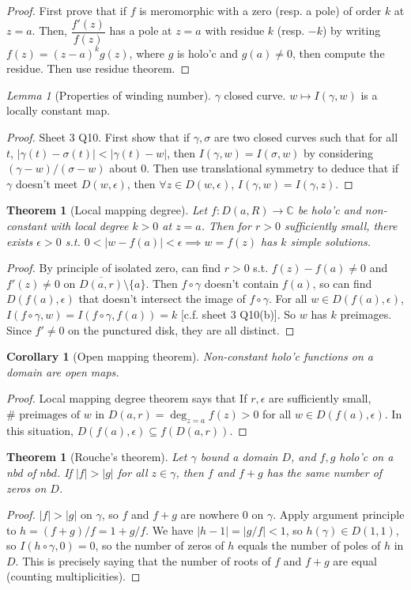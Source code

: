 \documentclass{article}
\theoremstyle{definition}
\theoremstyle{remark}
\newtheorem{lem}[defn]{Lemma}
\theoremstyle{plain}
\newtheorem{thm}[defn]{Theorem}
\newtheorem{crly}[defn]{Corollary}
\newcommand{\CC}{\mathbb{C}}
\begin{document}
\begin{proof}
    First prove that if $f$ is meromorphic with a zero (resp. a pole) of order $k$ at $z=a$. Then, $\dfrac{f'(z)}{f(z)}$ has a pole at $z=a$ with residue $k$ (resp. $-k$) by writing $f(z)=(z-a)^kg(z)$, where $g$ is holo'c and $g(a)\neq 0$, then compute the residue. Then use residue theorem.
\end{proof}
\begin{lem}[Properties of winding number]
    $\gamma$ closed curve. $w\mapsto I(\gamma,w)$ is a locally constant map.
\end{lem}
\begin{proof}
    Sheet 3 Q10. First show that if $\gamma,\sigma$ are two closed curves such that for all $t$, $|\gamma(t)-\sigma(t)|<|\gamma(t)-w|$, then $I(\gamma,w)=I(\sigma,w)$ by considering $(\gamma-w)/(\sigma-w)$ about $0$. Then use translational symmetry to deduce that if $\gamma$ doesn't meet $D(w,\epsilon)$, then $\forall z\in D(w,\epsilon)$, $I(\gamma,w)=I(\gamma,z)$.
\end{proof}
\begin{thm}[Local mapping degree]
    Let $f:D(a,R)\to\CC$ be holo'c and non-constant with local degree $k>0$ at $z=a$. Then for $r>0$ sufficiently small, there exists $\epsilon>0$ s.t. $0<|w-f(a)|<\epsilon\implies w=f(z)$ has $k$ simple solutions.
\end{thm}
\begin{proof}
    By principle of isolated zero, can find $r>0$ s.t. $f(z)-f(a)\neq 0$ and $f'(z)\neq 0$ on $\overline{D(a,r)}\setminus \{a\}$. Then $f\circ\gamma$ doesn't contain $f(a)$, so can find $D(f(a),\epsilon)$ that doesn't intersect the image of $f\circ\gamma$. For all $w\in D(f(a),\epsilon)$, $I(f\circ\gamma,w)=I(f\circ\gamma,f(a))=k$ [c.f. sheet 3 Q10(b)]. So $w$ has $k$ preimages. Since $f'\neq 0$ on the punctured disk, they are all distinct.
\end{proof}
\begin{crly}[Open mapping theorem]
    Non-constant holo'c functions on a domain are open maps.
\end{crly}
\begin{proof}
    Local mapping degree theorem says that If $r,\epsilon$ are sufficiently small, $\#\text{ preimages of }w\text{ in }D(a,r)=\deg_{z=a}f(z)>0$ for all $w\in D(f(a),\epsilon)$. In this situation, $D(f(a),\epsilon)\subseteq f(D(a,r))$.
\end{proof}
\begin{thm}[Rouche's theorem]
Let $\gamma$ bound a domain $D$, and $f,g$ holo'c on a nbd of $nbd$. If $|f|>|g|$ for all $z\in\gamma$, then $f$ and $f+g$ has the same number of zeros on $D$.
\end{thm}
\begin{proof}
    $|f|>|g|$ on $\gamma$, so $f$ and $f+g$ are nowhere $0$ on $\gamma$. Apply argument principle to $h=(f+g)/f=1+g/f$. We have $|h-1|=|g/f|<1$, so $h(\gamma)\in D(1,1)$, so $I(h\circ\gamma,0)=0$, so the number of zeros of $h$ equals the number of poles of $h$ in $D$. This is precisely saying that the number of roots of $f$ and $f+g$ are equal (counting multiplicities).
\end{proof}
\end{document}
